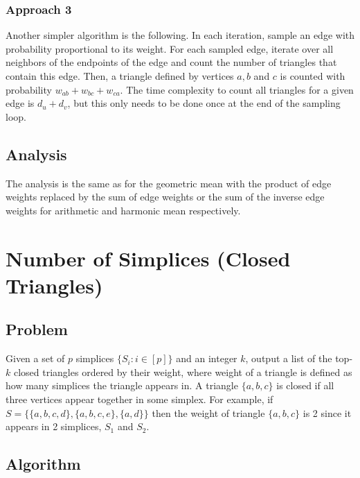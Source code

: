 \documentclass{article}
\begin{document}
\subsubsection{Approach 3}

Another simpler algorithm is the following. In each iteration, sample an edge
with probability proportional to its weight. For each sampled edge, iterate
over all neighbors of the endpoints of the edge and count the number of
triangles that contain this edge. Then, a triangle defined by vertices $a,b$
and $c$ is counted with probability $w_{ab} + w_{bc} + w_{ca}$. The time
complexity to count all triangles for a given edge is $d_u + d_v$, but this
only needs to be done once at the end of the sampling loop.


\subsection{Analysis}

The analysis is the same as for the geometric mean with the
product of edge weights replaced by the sum of edge weights
or the sum of the inverse edge weights for arithmetic and
harmonic mean respectively.


\section{Number of Simplices (Closed Triangles)}
\label{sec:number_closed}

\subsection{Problem}
Given a set of $p$ simplices $\{S_i : i \in [p]\}$ and
an integer $k$, output a list of the top-$k$ closed 
triangles ordered by their weight, where weight of a 
triangle is defined as how many simplices the triangle 
appears in.
A triangle $\{a,b,c\}$ is closed if all three vertices
appear together in some simplex.
For example, if $S = \{\{a,b,c,d\}, \{a,b,c,e\}, 
\{a,d\} \}$ then the weight of triangle $\{a,b,c\}$ is
2 since it appears in 2 simplices, $S_1$ and $S_2$.


\subsection{Algorithm}
\end{document}
